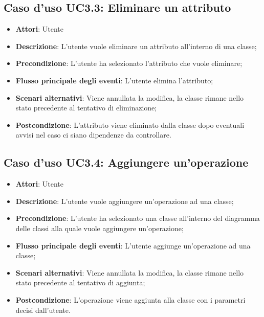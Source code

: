 \documentclass[../AnalisiDeiRequisiti.tex]{subfiles}
\begin{document}
		\subsection{Caso d'uso UC3.3: Eliminare un attributo}
		\begin{itemize}
			\item \textbf{Attori}: Utente
			\item \textbf{Descrizione}: L'utente vuole eliminare un attributo all'interno di una classe;
			\item \textbf{Precondizione}: L'utente ha selezionato l'attributo che vuole eliminare;
			\item \textbf{Flusso principale degli eventi}: L'utente elimina l'attributo;
			\item \textbf{Scenari alternativi}: Viene annullata la modifica, la classe rimane nello stato precedente al tentativo di eliminazione;
			\item \textbf{Postcondizione}: L'attributo viene eliminato dalla classe dopo eventuali avvisi nel caso ci siano dipendenze da controllare.
		\end{itemize}
		\subsection{Caso d'uso UC3.4: Aggiungere un'operazione}
		\begin{itemize}
			\item \textbf{Attori}: Utente
			\item \textbf{Descrizione}: L'utente vuole aggiungere un'operazione ad una classe;
			\item \textbf{Precondizione}: L'utente ha selezionato una classe all'interno del diagramma delle classi alla quale vuole aggiungere un'operazione;
			\item \textbf{Flusso principale degli eventi}: L'utente aggiunge un'operazione ad una classe;
			\item \textbf{Scenari alternativi}: Viene annullata la modifica, la classe rimane nello stato precedente al tentativo di aggiunta;
			\item \textbf{Postcondizione}: L'operazione viene aggiunta alla classe con i parametri decisi dall'utente.
		\end{itemize}
\end{document}

